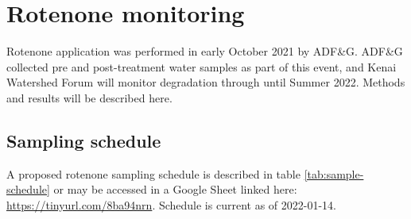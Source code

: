 \documentclass[
]{book}
\begin{document}
\hypertarget{rotenone-monitoring}{%
\chapter{Rotenone monitoring}\label{rotenone-monitoring}}

Rotenone application was performed in early October 2021 by ADF\&G. ADF\&G collected pre and post-treatment water samples as part of this event, and Kenai Watershed Forum will monitor degradation through until Summer 2022. Methods and results will be described here.

\hypertarget{sampling-schedule}{%
\section{Sampling schedule}\label{sampling-schedule}}

A proposed rotenone sampling schedule is described in table \ref{tab:sample-schedule} or may be accessed in a Google Sheet linked here: \url{https://tinyurl.com/8ba94nrn}. Schedule is current as of 2022-01-14.
\end{document}

